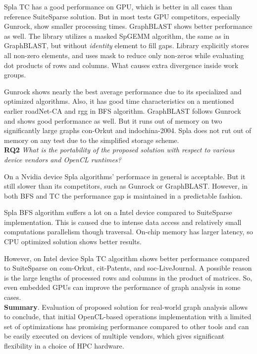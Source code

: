 Spla TC has a good performance on GPU, which is better in all cases than reference SuiteSparse solution. But in most tests GPU competitors, especially Gunrock, show smaller processing times. GraphBLAST shows better performance as well. The library utilizes a masked SpGEMM algorithm, the same as in GraphBLAST, but without \textit{identity} element to fill gaps. Library explicitly stores all non-zero elements, and uses mask to reduce only non-zeros while evaluating dot products of rows and columns. What causes extra divergence inside work groups. 

Gunrock shows nearly the best average performance due to its specialized and optimized algorithms. Also, it has good time characteristics on a mentioned earlier roadNet-CA and rgg in BFS algorithm. GraphBLAST follows Gunrock and shows good performance as well.  But it runs out of memory on two significantly large graphs con-Orkut and indochina-2004. Spla does not rut out of memory on any test due to the simplified storage scheme.\\

\textbf{RQ2} \textit{What is the portability of the proposed solution with respect to various device vendors and OpenCL runtimes?}

On a Nvidia device Spla algorithms' performace in general is acceptable. But it still slower than its competitors, such as Gunrock or GraphBLAST. However, in both BFS and TC the performance gap is maintained in a predictable fashion.

Spla BFS algorithm suffers a lot on a Intel device compared to SuiteSparse implementation. This is caused due to intense data access and relatively small computations parallelism though traversal. On-chip memory has larger latency, so CPU optimized solution shows better results. 

However, on Intel device Spla TC algorithm shows better performance compared to SuiteSparse on com-Orkut, cit-Patents, and soc-LiveJournal. A possible reason is the large lengths of processed rows and columns in the product of matrices. So, even embedded GPUs can improve the performance of graph analysis in some cases.\\

\textbf{Summary}. Evaluation of proposed solution for real-world graph analysis allows to conclude, that initial OpenCL-based operations implementation with a limited set of optimizations has promising performance compared to other tools and can be easily executed on devices of multiple vendors, which gives significant flexibility in a choice of HPC hardware. 